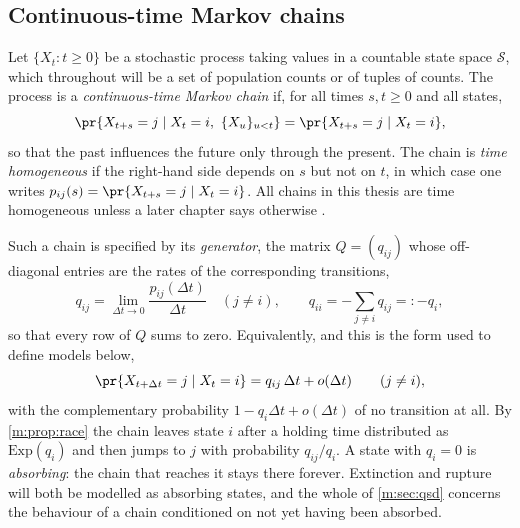 \subsection{Continuous-time Markov chains}
\label{m:sec:ctmc}

Let $\{X_t : t\ge0\}$ be a stochastic process taking values in a countable state
space $\mathcal S$, which throughout will be a set of population counts or of
tuples of counts. The process is a \emph{continuous-time Markov chain} if, for all
times $s,t\ge0$ and all states,
\begin{equation}
\label{m:eq:markov}
\pr{X_{t+s} = j \mid X_t = i,\ \{X_u\}_{u<t}} = \pr{X_{t+s}=j\mid X_t = i},
\end{equation}
so that the past influences the future only through the present. The chain is
\emph{time homogeneous} if the right-hand side depends on $s$ but not on $t$, in
which case one writes $p_{ij}(s) = \pr{X_{t+s}=j\mid X_t=i}$. All chains in this
thesis are time homogeneous unless a later chapter says otherwise
.

Such a chain is specified by its \emph{generator}, the matrix $Q = (q_{ij})$ whose
off-diagonal entries are the rates of the corresponding transitions,
\begin{equation}
\label{m:eq:generator}
q_{ij} = \lim_{\Delta t\to0}\frac{p_{ij}(\Delta t)}{\Delta t}\quad(j\neq i),
\qquad
q_{ii} = -\sum_{j\neq i}q_{ij} =: -q_i ,
\end{equation}
so that every row of $Q$ sums to zero. Equivalently, and this is the form used to
define models below,
\begin{equation}
\label{m:eq:infinitesimal}
\pr{X_{t+\Delta t} = j \mid X_t = i} = q_{ij}\,\Delta t + o(\Delta t)
\qquad (j \neq i),
\end{equation}
with the complementary probability $1-q_i\Delta t + o(\Delta t)$ of no transition
at all. By \cref{m:prop:race} the chain leaves state $i$ after a holding time
distributed as $\mathrm{Exp}(q_i)$ and then jumps to $j$ with probability
$q_{ij}/q_i$. A state with $q_i=0$ is \emph{absorbing}: the chain that reaches it
stays there forever. Extinction and rupture will both be modelled as absorbing
states, and the whole of \cref{m:sec:qsd} concerns the behaviour of a chain
conditioned on not yet having been absorbed.


